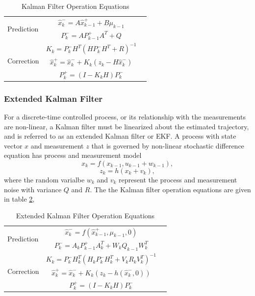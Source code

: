 \begin{table}
\caption{Kalman Filter Operation Equations}
\label{tab:KF}
\centering
\begin{tabular}{|l|c r|}
\hline
\multirow{2}{*}{Prediction} 
& $\hat{x}^-_k=A\hat{x}^+_{k-1}+B\mu_{k-1}$ & \stepcounter{equation}\thetag{\theequation}\\
& $P^-_k = AP^+_{k-1}A^T+Q$ & \stepcounter{equation}\thetag{\theequation}\\
\hline
\multirow{3}{*}{Correction}
& $K_k=P^-_kH^T(HP^-_kH^T+R)^{-1}$  & \stepcounter{equation}\thetag{\theequation}\\
& $\hat{x}^+_k = \hat{x}^-_k+K_k(z_k-H\hat{x}^-_k)$ & \stepcounter{equation}\thetag{\theequation}\\
& $P^+_k = (I-K_kH)P^-_k$ & \stepcounter{equation}\thetag{\theequation}\\
\hline
\end{tabular}
\end{table}
\FloatBarrier

\subsubsection{Extended Kalman Filter}
For a discrete-time controlled process, or its relationship with the
measurements are non-linear, a Kalman filter must be linearized about
the estimated trajectory, and is referred to as an extended Kalman
filter or EKF. A process with state vector $x$ and measurement $z$
that is governed by non-linear stochastic difference equation has
process and measurement model 
\begin{equation}
x_k=f(x_{k-1}, u_{k-1}+w_{k-1}),
\end{equation}
\begin{equation}
z_k=h(x_k+v_k),
\end{equation}
\noindent where the random varialbe $w_k$ and $v_k$ represent the
process and measurement noise with variance $Q$ and $R$. The the
Kalman filter operation equations are given in table
\ref{tab:EKF},

\begin{table}[H]
\caption{Extended Kalman Filter Operation Equations}
\label{tab:EKF}
\centering
\begin{tabular}{|l|c r|}
\hline
\multirow{2}{*}{Prediction} 
& $\hat{x}^-_k=f(\hat{x}^+_{k-1},\mu_{k-1},0)$ & \stepcounter{equation}\thetag{\theequation}\\
& $P^-_k = A_kP^+_{k-1}A_k^T+W_kQ_{k-1}W_k^T$ & \stepcounter{equation}\thetag{\theequation}\\
\hline
\multirow{3}{*}{Correction}
& $K_k=P^-_kH_k^T(H_kP^-_kH_k^T+V_kR_kV_k^T)^{-1}$  & \stepcounter{equation}\thetag{\theequation}\\
& $\hat{x}^+_k = \hat{x}^-_k+K_k(z_k-h(\hat{x}^-_k,0))$ & \stepcounter{equation}\thetag{\theequation}\\
& $P^+_k = (I-K_kH)P^-_k$ & \stepcounter{equation}\thetag{\theequation}\\
\hline
\end{tabular}
\end{table}
\FloatBarrier

